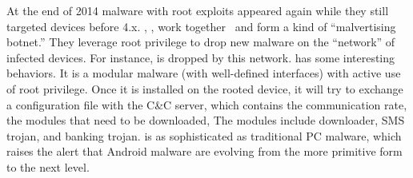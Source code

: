 At the end of 2014 malware with root exploits appeared again while 
they still targeted devices before 4.x. 
, ,  work together~\cite{takingRoot}
and form a kind of ``malvertising botnet.''
They leverage root privilege to drop new  malware on the ``network'' 
of infected devices.
For instance,  is dropped by this network.  has some
interesting behaviors.
It is a modular malware (with well-defined interfaces) 
with active use of root privilege.
Once it is installed on the rooted device, it will try to exchange
a configuration file with the C\&C server, which contains 
the communication rate, the modules that need to be downloaded, \etc
The modules include downloader, SMS trojan, and banking trojan.
 is as sophisticated as 
traditional PC malware, which raises the alert that Android malware 
are evolving from the more primitive form to the next level.

